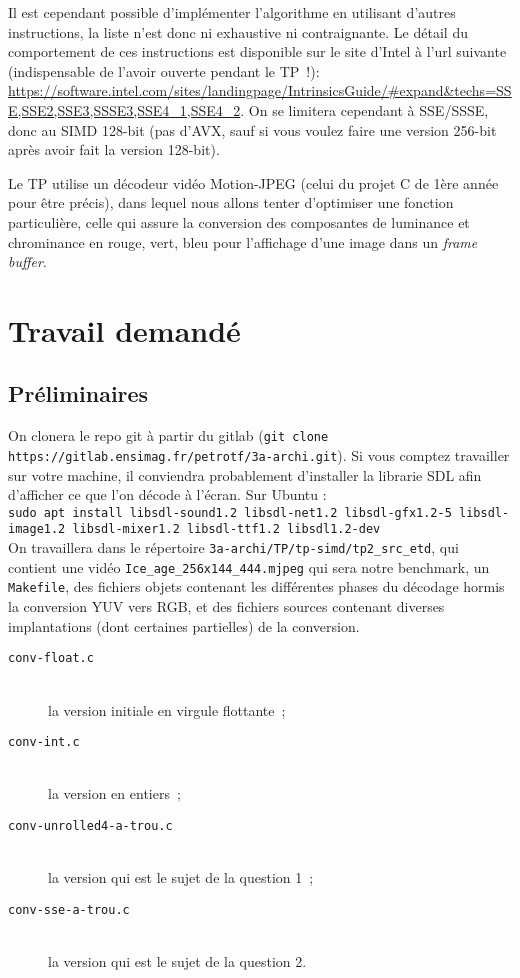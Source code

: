 \documentclass[a4paper,12pt]{article}
\begin{document}
\vspace{10pt}
Il est cependant possible d'implémenter l'algorithme en utilisant d'autres instructions, la liste n'est donc ni exhaustive ni contraignante. Le détail du comportement de ces instructions est disponible sur le site d'Intel à l'url suivante (indispensable de l'avoir ouverte pendant le TP~!):\\
{\footnotesize\ttfamily \url{https://software.intel.com/sites/landingpage/IntrinsicsGuide/#expand&techs=SSE,SSE2,SSE3,SSSE3,SSE4_1,SSE4_2}}. On se limitera cependant à SSE/SSSE, donc au SIMD 128-bit (pas d'AVX, sauf si vous voulez faire une version 256-bit après avoir fait la version 128-bit).

Le TP utilise un décodeur vidéo Motion-JPEG (celui du projet C de 1ère année pour être précis), dans lequel nous allons tenter d'optimiser une fonction particulière, celle qui assure la conversion des composantes de luminance et chrominance en rouge, vert, bleu pour l'affichage d'une image dans un \emph{frame buffer}.

\section{Travail demandé}

\subsection{Préliminaires}

On clonera le repo git à partir du gitlab (\lstinline{git clone  https://gitlab.ensimag.fr/petrotf/3a-archi.git}). Si vous comptez travailler sur votre machine, il conviendra probablement d'installer la librarie SDL afin d'afficher ce que l'on décode à l'écran. Sur Ubuntu : \\

\lstinline{sudo apt install libsdl-sound1.2 libsdl-net1.2 libsdl-gfx1.2-5 libsdl-image1.2 libsdl-mixer1.2 libsdl-ttf1.2 libsdl1.2-dev} \\


On travaillera dans le répertoire \lstinline{3a-archi/TP/tp-simd/tp2_src_etd}, qui contient une vidéo \lstinline{Ice_age_256x144_444.mjpeg} qui sera notre benchmark, un \lstinline{Makefile}, des fichiers objets contenant les différentes phases du décodage hormis la conversion YUV vers RGB, et des fichiers sources contenant diverses implantations (dont certaines partielles) de la conversion.
\begin{description}
\item[\texttt{conv-float.c}]~\\
     la version initiale en virgule flottante~;
\item[\texttt{conv-int.c}]~\\
     la version en entiers~;
\item[\texttt{conv-unrolled4-a-trou.c}]~\\
     la version qui est le sujet de la question 1~;
\item[\texttt{conv-sse-a-trou.c}]~\\
     la version qui est le sujet de la question 2.
\end{description}
\end{document}
